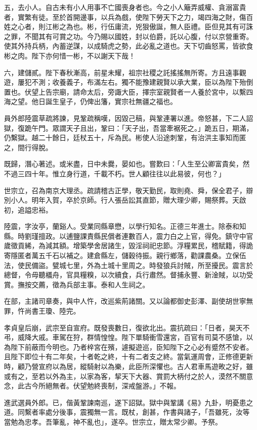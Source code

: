 \begin{pinyinscope}
五，去小人。自古未有小人用事不亡國喪身者也。今之小人簸弄威權、貪溺富貴者，實繁有徒。至於首開邊事，以兵為戲，使陛下勞天下之力，竭四海之財，傷百姓之心者，則江彬之為也。彬，行伍庸流，兇狠傲誕，無人臣禮。臣但見其有可誅之罪，不聞其有可賞之功。今乃賜以國姓，封以伯爵，託以心腹，付以京營重寄。使其外持兵柄，內蓄逆謀，以成騎虎之勢，此必亂之道也。天下切齒怒罵，皆欲食彬之肉。陛下亦何惜一彬，不以謝天下哉！

六，建儲貳。陛下春秋漸高，前星未耀，祖宗社稷之託搖搖無所寄。方且遠事觀遊，屢犯不測；收養義子，布滿左右。獨不能豫建親賢以承大業，臣以為陛下殆倒置也。伏望上告宗廟，請命太后，旁諏大臣，擇宗室親賢者一人養於宮中，以繫四海之望。他日誕生皇子，仍俾出籓，實宗社無疆之福也。

員外郎陸震草疏將諫，見鞏疏稱嘆，因毀己稿，與鞏連署以進。帝怒甚，下二人詔獄，復跪午門。眾謂天子且出，鞏曰：「天子出，吾當牽裾死之。」跪五日，期滿，仍繫獄。越二十餘日，廷杖五十，斥為民。彬使人沿途刺鞏，有治洪主事知而匿之，間行得脫。

既歸，潛心著述。或米盡，日中未爨，晏如也。嘗歎曰：「人生至公卿富貴矣，然不過三四十年。惟立身行道，千載不朽。世人顧往往以此易彼，何也？」

世宗立，召為南京大理丞。疏請稽古正學，敬天勤民，取則堯、舜，保全君子，辯別小人。明年入賀，卒於京師。行人張岳訟其直節，贈大理少卿，賜祭葬。天啟初，追謚忠裕。

陸震，字汝亭，蘭谿人。受業同縣章懋，以學行知名。正德三年進士。除泰和知縣。時劉瑾擅政。以逋鹽課責縣民償者連數百人，震力白之上官，得免。鎮守中官歲徵貢絺，為減其額。增築學舍居諸生，毀淫祠祀忠節。浮糧累民，稽賦籍，得詭寄隱匿者萬五千石以補之。建倉縣左，儲穀待振。親行鄉落，勸課農桑。立保伍法，使民備盜。甓城七里，外為土城十里周之。時發狼兵討賊，所至擾民。震言於總督，令毋聽檥舟，官具糧糗，以次續食，兵行肅然。督捕永豐、新淦賊，以功受賞。撫按交薦，徵為兵部主事。泰和人生祠之。

在部，主諸司章奏，與中人忤，改巡紫荊諸關。又以論都御史彭澤、副使胡世寧無罪，忤尚書王瓊、陸完。

孝貞皇后崩，武宗至自宣府。既發喪數日，復欲北出。震抗疏曰：「日者，昊天不弔，威降大戚。車駕在狩，群情惶惶。陛下單騎衝雪還宮，百官有司莫不感愴，以為陛下前蔽而今明也。乃者梓宮在殯，遽擬遊巡，臣知陛下之心必有蹙然不安者。且陛下即位十有二年矣，十者乾之終，十有二者支之終。當氣運周會，正修德更新時，顧乃營宣府以為居，縱騎射以為樂，此臣所深懼也。古人君車馬遊畋之好，雖或有之，至若以外為主，以家為客，挈天下大器、賞罰大柄付之於人，漠然不關意念，此古今所絕無者。伏望勉終喪制，深戒盤游。」不報。

進武選員外郎。已，偕黃鞏諫南巡，遂下詔獄。獄中與鞏講《易》九卦，明憂患之道。同繫者率處分後事，震獨無一言。既杖，創甚，作書與諸子，「吾雖死，汝等當勉為忠孝。吾筆亂，神不亂也」，遂卒。世宗立，贈太常少卿。予祭。


\end{pinyinscope}
